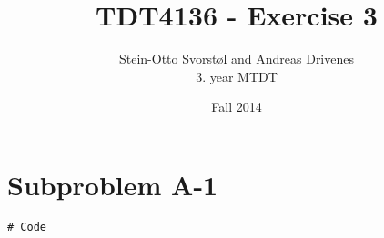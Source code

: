 \documentclass[11pt,a4paper]{article}
\author{Stein-Otto Svorstøl and Andreas Drivenes
\\3. year MTDT}
\title{TDT4136 - Exercise 3}
\date{Fall 2014}
\begin{document}
\maketitle

\section*{Subproblem A-1}
\begin{lstlisting}
# Code
\end{lstlisting}
\end{document}
